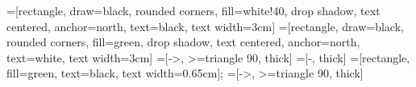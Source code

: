 \documentclass{minimal}
\begin{document}
=[rectangle, draw=black, rounded corners, fill=white!40, drop shadow,
        text centered, anchor=north, text=black, text width=3cm]
=[rectangle, draw=black, rounded corners, fill=green, drop shadow,
        text centered, anchor=north, text=white, text width=3cm]
=[->, >=triangle 90, thick]
=[-, thick]
=[rectangle, fill=green, text=black, text width=0.65cm];
=[->, >=triangle 90, thick]

\begin{center}
\end{center}
\end{document}
